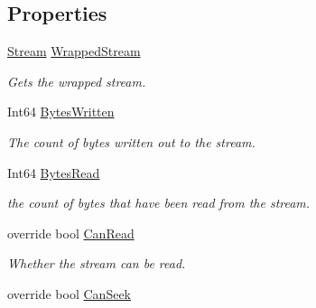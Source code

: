 \subsection*{Properties}
\begin{DoxyCompactItemize}
\item 
\mbox{\hyperlink{namespace_super_tiled2_unity_1_1_ionic_1_1_zip_a9ced5352c56e7e0fceff15b534073c83aeae835e83c0494a376229f254f7d3392}{Stream}} \mbox{\hyperlink{class_super_tiled2_unity_1_1_ionic_1_1_zip_1_1_counting_stream_ab24a8adaaf5e421a3e81b33a47ad03d6}{Wrapped\+Stream}}
\begin{DoxyCompactList}\small\item\em Gets the wrapped stream. \end{DoxyCompactList}\item 
Int64 \mbox{\hyperlink{class_super_tiled2_unity_1_1_ionic_1_1_zip_1_1_counting_stream_adc0a575ca59ac20c085592fd14ada256}{Bytes\+Written}}
\begin{DoxyCompactList}\small\item\em The count of bytes written out to the stream. \end{DoxyCompactList}\item 
Int64 \mbox{\hyperlink{class_super_tiled2_unity_1_1_ionic_1_1_zip_1_1_counting_stream_a62093c9eef3d18da98dc9e4a78d90f42}{Bytes\+Read}}
\begin{DoxyCompactList}\small\item\em the count of bytes that have been read from the stream. \end{DoxyCompactList}\item 
override bool \mbox{\hyperlink{class_super_tiled2_unity_1_1_ionic_1_1_zip_1_1_counting_stream_a73f65c23bf5b635ffc6c7b658a84038e}{Can\+Read}}
\begin{DoxyCompactList}\small\item\em Whether the stream can be read. \end{DoxyCompactList}\item 
override bool \mbox{\hyperlink{class_super_tiled2_unity_1_1_ionic_1_1_zip_1_1_counting_stream_af39a86a5f5c3132a602c835945be93ba}{Can\+Seek}}

\end{DoxyCompactItemize}
